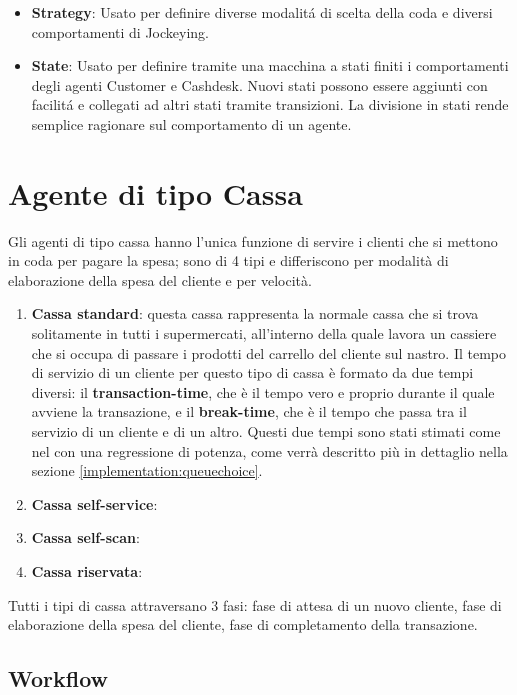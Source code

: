\begin{itemize}
\item \textbf{Strategy}: Usato per definire diverse modalitá di scelta
  della coda e diversi comportamenti di Jockeying.
\item \textbf{State}: Usato per definire tramite una macchina a stati
  finiti i comportamenti degli agenti Customer e Cashdesk. Nuovi stati
  possono essere aggiunti con facilitá e collegati ad altri stati
  tramite transizioni. La divisione in stati rende semplice ragionare
  sul comportamento di un agente.
\end{itemize}

\section{Agente di tipo Cassa}


Gli agenti di tipo cassa hanno l'unica funzione di servire i clienti che si mettono in coda per pagare la spesa; sono di 4 tipi e differiscono per modalità di elaborazione della spesa del cliente e per velocità.

\begin{enumerate}
\item \textbf{Cassa standard}: questa cassa rappresenta la normale cassa che si trova solitamente in tutti i supermercati, all'interno della quale lavora un cassiere che si occupa di passare i prodotti del carrello del cliente sul nastro. 
  Il tempo di servizio di un cliente per questo tipo di cassa è formato da due tempi diversi: il \textbf{transaction-time}, che è il tempo vero e proprio durante il quale avviene la transazione, e il \textbf{break-time}, che è il tempo che passa tra il servizio di un cliente e di un altro. Questi due tempi sono stati stimati come nel \cite{article1} con una regressione di potenza, come verrà descritto più in dettaglio nella sezione \ref{implementation:queuechoice}.
\item \textbf{Cassa self-service}:
\item \textbf{Cassa self-scan}:
\item \textbf{Cassa riservata}:
\end{enumerate}

Tutti i tipi di cassa attraversano 3 fasi: fase di attesa di un nuovo cliente, fase di elaborazione della spesa del cliente, fase di completamento della transazione.

\subsection{Workflow}

